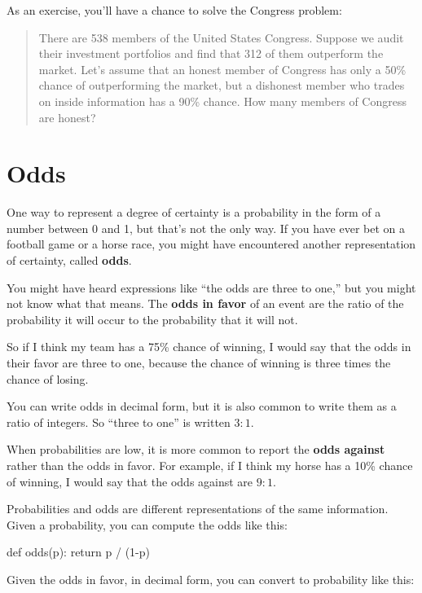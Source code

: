 \documentclass[12pt]{book}
\theoremstyle{exercise}
\begin{document}
As an exercise, you'll have a chance to solve the Congress problem:

\begin{quote}
There are 538 members of the United States Congress.
Suppose we audit their investment portfolios and find that 312 of them outperform the market.
Let's assume that an honest member of Congress has only a 50\% chance of outperforming the market, but a dishonest member who trades on inside information has a 90\% chance.  How many members of Congress are honest?
\end{quote}


\section{Odds}

One way to represent a degree of certainty is a probability in the form of a number between 0 and 1, but that's not the only way.
If you have ever bet on a football game or a horse race, you might have encountered another representation of certainty, called {\bf odds}.


You might have heard expressions like ``the odds are
three to one,'' but you might not know what that means.
The {\bf odds in favor} of an event are the ratio of the probability
it will occur to the probability that it will not.

So if I think my team has a 75\% chance of winning, I would
say that the odds in their favor are three to one, because
the chance of winning is three times the chance of losing.

You can write odds in decimal form, but it is also common to
write them as a ratio of integers.  So ``three to one'' is
written $3:1$.

When probabilities are low, it is more common to report the
{\bf odds against} rather than the odds in favor.  For
example, if I think my horse has a 10\% chance of winning,
I would say that the odds against are $9:1$.

Probabilities and odds are different representations of the
same information.  Given a probability, you can compute the
odds like this:

\begin{code}
def odds(p):
    return p / (1-p)
\end{code}

Given the odds in favor, in decimal form, you can convert to probability like this:
\end{document}
